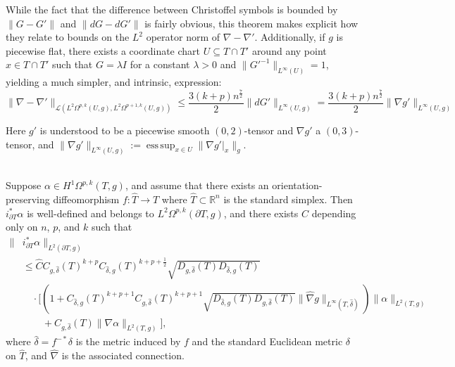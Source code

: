 \documentclass[10pt,a4paper]{amsart}
\DeclareMathOperator*{\esssup}{ess\,sup}
\begin{document}
\begin{remark}
While the fact that the difference between Christoffel symbols is bounded by $\|G - G'\|$ and $\|dG - dG'\|$ is fairly obvious, this theorem makes explicit how they relate to bounds on the $L^2$ operator norm of $\nabla - \nabla'$. Additionally, if $g$ is piecewise flat, there exists a coordinate chart $U \subseteq T \cap T'$ around any point $x \in T \cap T'$ such that $G = \lambda I$ for a constant $\lambda > 0$ and $\|G'^{-1}\|_{L^\infty(U)} = 1$, yielding a much simpler, and intrinsic, expression:
\begin{equation}\label{simplecomparecov}\|\nabla - \nabla'\|_{\mathcal{L}(L^2\Omega^{p,k}(U,g),L^2\Omega^{p+1,k}(U,g))} \le \frac{3(k+p)n^\frac{7}{2}}{2}\|dG'\|_{L^\infty(U,g)} = \frac{3(k+p)n^\frac{7}{2}}{2}\|\nabla g'\|_{L^\infty(U,g)}\end{equation} 

Here $g'$ is understood to be a piecewise smooth $(0,2)$-tensor and $\nabla g'$ a $(0,3)$-tensor, and $\|\nabla g'\|_{L^\infty(U,g)} := \esssup_{x \in U}\|\nabla g'|_x\|_g$.
\end{remark}

\begin{theorem}
\label{H1tracethrm}\;\\
Suppose $\alpha \in H^1\Omega^{p,k}(T,g)$, and assume that there exists an orientation-preserving diffeomorphism $f: \hat T \to T$ where $\hat T \subset \mathbb{R}^n$ is the standard simplex. Then $i_{\partial T}^*\alpha$ is well-defined and belongs to $L^2\Omega^{p,k}(\partial T,g)$, and there exists $\hat{C}$ depending only on $n$, $p$, and $k$ such that
\begin{align*}
\|&i_{\partial T}^*\alpha\|_{L^2(\partial T,g)} \\&\le \hat C  C_{g,\hat \delta}(T)^{k + p} C_{\hat \delta,g}(T)^{k+p + \frac{1}{2}}\sqrt{D_{g,\hat \delta}(T)D_{\hat \delta,g}(T)} \\
&\quad\cdot \bigg[\left(1 + C_{\hat \delta, g}(T)^{k+p + 1}C_{g,\hat \delta}(T)^{k+p + 1}\sqrt{D_{\hat \delta,g}(T)D_{g,\hat \delta}(T)} \|\hat \nabla g\|_{L^\infty(T,\hat \delta)}\right)\|\alpha\|_{L^2(T,g)} \\
&\quad\quad + C_{g,\hat \delta}(T)\|\nabla \alpha\|_{L^2(T,g)}\bigg],
\end{align*}
where $\hat \delta = f^{-*} \delta$ is the metric induced by $f$ and the standard Euclidean metric $\delta$ on $\hat T$, and $\hat\nabla$ is the associated connection.
\end{theorem}
\end{document}
